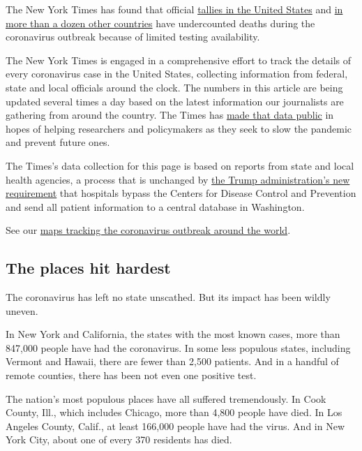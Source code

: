 The New York Times has found that official
\href{https://www.nytimes.com/interactive/2020/04/28/us/coronavirus-death-toll-total.html}{tallies
in the United States} and
\href{https://www.nytimes.com/interactive/2020/04/21/world/coronavirus-missing-deaths.html}{in
more than a dozen other countries} have undercounted deaths during the
coronavirus outbreak because of limited testing availability.

The New York Times is engaged in a comprehensive effort to track the
details of every coronavirus case in the United States, collecting
information from federal, state and local officials around the clock.
The numbers in this article are being updated several times a day based
on the latest information our journalists are gathering from around the
country. The Times has
\href{https://www.nytimes.com/article/coronavirus-county-data-us.html?action=click\&module=Spotlight\&pgtype=Homepage}{made
that data public} in hopes of helping researchers and policymakers as
they seek to slow the pandemic and prevent future ones.

The Times's data collection for this page is based on reports from state
and local health agencies, a process that is unchanged by
\href{https://www.nytimes.com/2020/07/14/us/politics/trump-cdc-coronavirus.html}{the
Trump administration's new requirement} that hospitals bypass the
Centers for Disease Control and Prevention and send all patient
information to a central database in Washington.

See our
\href{https://www.nytimes.com/interactive/2020/world/coronavirus-maps.html}{maps
tracking the coronavirus outbreak around the world}.

\hypertarget{the-places-hit-hardest}{%
\subsection{The places hit hardest}\label{the-places-hit-hardest}}

The coronavirus has left no state unscathed. But its impact has been
wildly uneven.

In New York and California, the states with the most known cases, more
than 847,000 people have had the coronavirus. In some less populous
states, including Vermont and Hawaii, there are fewer than 2,500
patients. And in a handful of remote counties, there has been not even
one positive test.

The nation's most populous places have all suffered tremendously. In
Cook County, Ill., which includes Chicago, more than 4,800 people have
died. In Los Angeles County, Calif., at least 166,000 people have had
the virus. And in New York City, about one of every 370 residents has
died.

